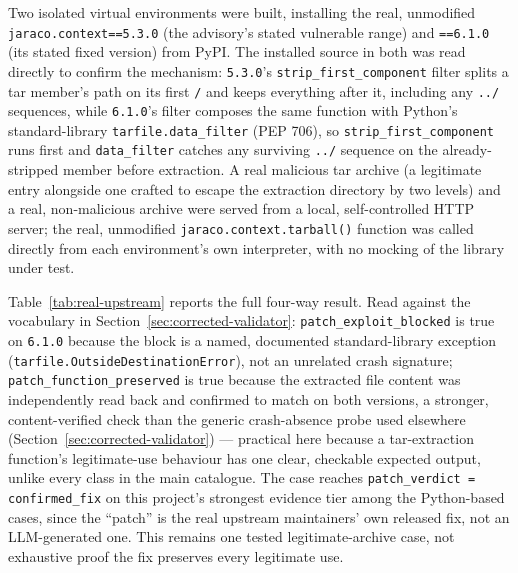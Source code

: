 \documentclass[12pt,a4paper]{report}
\begin{document}
Two isolated virtual environments were built, installing the real, unmodified \texttt{jaraco.context==5.3.0} (the advisory's stated vulnerable range) and \texttt{==6.1.0} (its stated fixed version) from PyPI. The installed source in both was read directly to confirm the mechanism: \texttt{5.3.0}'s \texttt{strip\_first\_component} filter splits a tar member's path on its first \texttt{/} and keeps everything after it, including any \texttt{../} sequences, while \texttt{6.1.0}'s filter composes the same function with Python's standard-library \texttt{tarfile.data\_filter} (PEP 706), so \texttt{strip\_first\_component} runs first and \texttt{data\_filter} catches any surviving \texttt{../} sequence on the already-stripped member before extraction. A real malicious tar archive (a legitimate entry alongside one crafted to escape the extraction directory by two levels) and a real, non-malicious archive were served from a local, self-controlled HTTP server; the real, unmodified \texttt{jaraco.context.tarball()} function was called directly from each environment's own interpreter, with no mocking of the library under test.

Table~\ref{tab:real-upstream} reports the full four-way result. Read against the vocabulary in Section~\ref{sec:corrected-validator}: \texttt{patch\_exploit\_blocked} is true on \texttt{6.1.0} because the block is a named, documented standard-library exception (\texttt{tarfile.OutsideDestinationError}), not an unrelated crash signature; \texttt{patch\_function\_preserved} is true because the extracted file content was independently read back and confirmed to match on both versions, a stronger, content-verified check than the generic crash-absence probe used elsewhere (Section~\ref{sec:corrected-validator}) — practical here because a tar-extraction function's legitimate-use behaviour has one clear, checkable expected output, unlike every class in the main catalogue. The case reaches \texttt{patch\_verdict = confirmed\_fix} on this project's strongest evidence tier among the Python-based cases, since the ``patch'' is the real upstream maintainers' own released fix, not an LLM-generated one. This remains one tested legitimate-archive case, not exhaustive proof the fix preserves every legitimate use.
\end{document}
